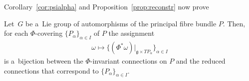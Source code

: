  Corollary~\ref{cor:psialpha} and Proposition~\ref{prop:reconstr} now prove
\begin{Theorem}\label{th:InvConnes}
Let~$G$ be a~Lie group of automorphisms of the principal fibre bundle $P$.
Then, for each $\Phi$-covering $\{P_\alpha\}_{\alpha\in I}$ of $P$
the assignment
\begin{gather*}
	\omega \mapsto \{(\Phi^*\omega)|_{\mathfrak{g}\times TP_\alpha}\}_{\alpha\in I}
\end{gather*}
is a~bijection between
the $\Phi$-invariant connections on $P$ and the
reduced connections that correspond to $\{P_\alpha\}_{\alpha\in I}$.
\end{Theorem}

